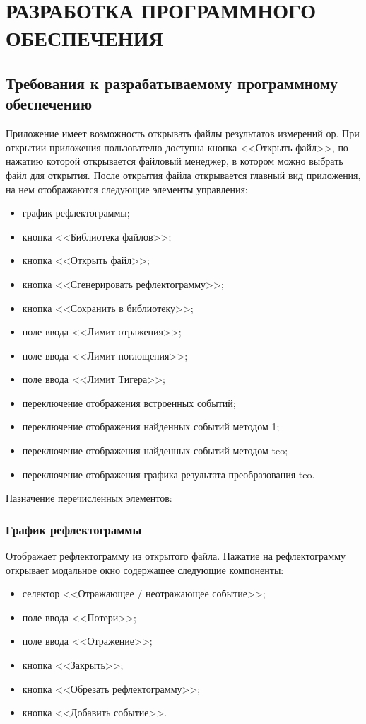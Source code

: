 \section{РАЗРАБОТКА ПРОГРАММНОГО ОБЕСПЕЧЕНИЯ}
\subsection{Требования к разрабатываемому программному обеспечению}

Приложение имеет возможность открывать файлы результатов измерений \acrshort{ор}.
При открытии приложения пользователю доступна кнопка <<Открыть файл>>, по нажатию которой открывается файловый менеджер, в котором можно выбрать файл для открытия.
После открытия файла открывается главный \gls{вид} приложения, на нем отображаются следующие элементы управления:
\begin{itemize}
  \item график рефлектограммы;
  \item кнопка <<Библиотека файлов>>;
  \item кнопка <<Открыть файл>>;
  \item кнопка <<Сгенерировать рефлектограмму>>;
  \item кнопка <<Сохранить в библиотеку>>;
  \item поле ввода <<Лимит отражения>>;
  \item поле ввода <<Лимит поглощения>>;
  \item поле ввода <<Лимит Тигера>>;
  \item переключение отображения встроенных событий;
  \item переключение отображения найденных событий методом 1;
  \item переключение отображения найденных событий методом \acrshort{teo};
  \item переключение отображения графика результата преобразования \acrshort{teo}.
\end{itemize}

Назначение перечисленных элементов:

\subsubsection{График рефлектограммы}

Отображает рефлектограмму из открытого файла. Нажатие на рефлектограмму открывает \gls{модальное окно} содержащее следующие компоненты:

\begin{itemize}
  \item селектор <<Отражающее / неотражающее событие>>;
  \item поле ввода <<Потери>>;
  \item поле ввода <<Отражение>>;
  \item кнопка <<Закрыть>>;
  \item кнопка <<Обрезать рефлектограмму>>;
  \item кнопка <<Добавить событие>>.
\end{itemize}

